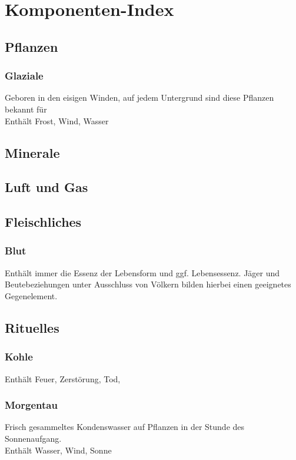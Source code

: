 \documentclass[a4paper,12pt,oneside]{book}
\begin{document}
\part{Komponenten-Index}

\chapter{Pflanzen}

\section{Glaziale}
Geboren in den eisigen Winden, auf jedem Untergrund sind diese Pflanzen bekannt für 
\\Enthält Frost, Wind, Wasser

\chapter{Minerale}

\chapter{Luft und Gas}

\chapter{Fleischliches}

\section{Blut}
Enthält immer die Essenz der Lebensform und ggf. Lebensessenz. Jäger und Beutebeziehungen unter Ausschluss von Völkern bilden hierbei einen geeignetes Gegenelement.

\chapter{Rituelles}

\section{Kohle}
Enthält Feuer, Zerstörung, Tod, 

\section{Morgentau}
Frisch gesammeltes Kondenswasser auf Pflanzen in der Stunde des Sonnenaufgang.
\\Enthält Wasser, Wind, Sonne
\end{document}
